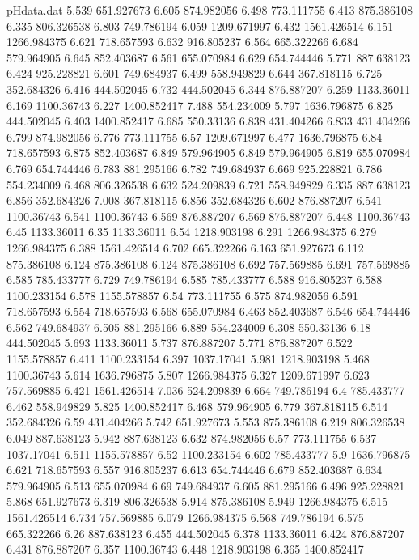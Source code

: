 \begin{filecontents}{pHdata.dat}
5.539	651.927673
6.605	874.982056
6.498	773.111755
6.413	875.386108
6.335	806.326538
6.803	749.786194
6.059	1209.671997
6.432	1561.426514
6.151	1266.984375
6.621	718.657593
6.632	916.805237
6.564	665.322266
6.684	579.964905
6.645	852.403687
6.561	655.070984
6.629	654.744446
5.771	887.638123
6.424	925.228821
6.601	749.684937
6.499	558.949829
6.644	367.818115
6.725	352.684326
6.416	444.502045
6.732	444.502045
6.344	876.887207
6.259	1133.36011
6.169	1100.36743
6.227	1400.852417
7.488	554.234009
5.797	1636.796875
6.825	444.502045
6.403	1400.852417
6.685	550.33136
6.838	431.404266
6.833	431.404266
6.799	874.982056
6.776	773.111755
6.57	1209.671997
6.477	1636.796875
6.84	718.657593
6.875	852.403687
6.849	579.964905
6.849	579.964905
6.819	655.070984
6.769	654.744446
6.783	881.295166
6.782	749.684937
6.669	925.228821
6.786	554.234009
6.468	806.326538
6.632	524.209839
6.721	558.949829
6.335	887.638123
6.856	352.684326
7.008	367.818115
6.856	352.684326
6.602	876.887207
6.541	1100.36743
6.541	1100.36743
6.569	876.887207
6.569	876.887207
6.448	1100.36743
6.45	1133.36011
6.35	1133.36011
6.54	1218.903198
6.291	1266.984375
6.279	1266.984375
6.388	1561.426514
6.702	665.322266
6.163	651.927673
6.112	875.386108
6.124	875.386108
6.124	875.386108
6.692	757.569885
6.691	757.569885
6.585	785.433777
6.729	749.786194
6.585	785.433777
6.588	916.805237
6.588	1100.233154
6.578	1155.578857
6.54	773.111755
6.575	874.982056
6.591	718.657593
6.554	718.657593
6.568	655.070984
6.463	852.403687
6.546	654.744446
6.562	749.684937
6.505	881.295166
6.889	554.234009
6.308	550.33136
6.18	444.502045
5.693	1133.36011
5.737	876.887207
5.771	876.887207
6.522	1155.578857
6.411	1100.233154
6.397	1037.17041
5.981	1218.903198
5.468	1100.36743
5.614	1636.796875
5.807	1266.984375
6.327	1209.671997
6.623	757.569885
6.421	1561.426514
7.036	524.209839
6.664	749.786194
6.4	785.433777
6.462	558.949829
5.825	1400.852417
6.468	579.964905
6.779	367.818115
6.514	352.684326
6.59	431.404266
5.742	651.927673
5.553	875.386108
6.219	806.326538
6.049	887.638123
5.942	887.638123
6.632	874.982056
6.57	773.111755
6.537	1037.17041
6.511	1155.578857
6.52	1100.233154
6.602	785.433777
5.9	1636.796875
6.621	718.657593
6.557	916.805237
6.613	654.744446
6.679	852.403687
6.634	579.964905
6.513	655.070984
6.69	749.684937
6.605	881.295166
6.496	925.228821
5.868	651.927673
6.319	806.326538
5.914	875.386108
5.949	1266.984375
6.515	1561.426514
6.734	757.569885
6.079	1266.984375
6.568	749.786194
6.575	665.322266
6.26	887.638123
6.455	444.502045
6.378	1133.36011
6.424	876.887207
6.431	876.887207
6.357	1100.36743
6.448	1218.903198
6.365	1400.852417

\end{filecontents}
